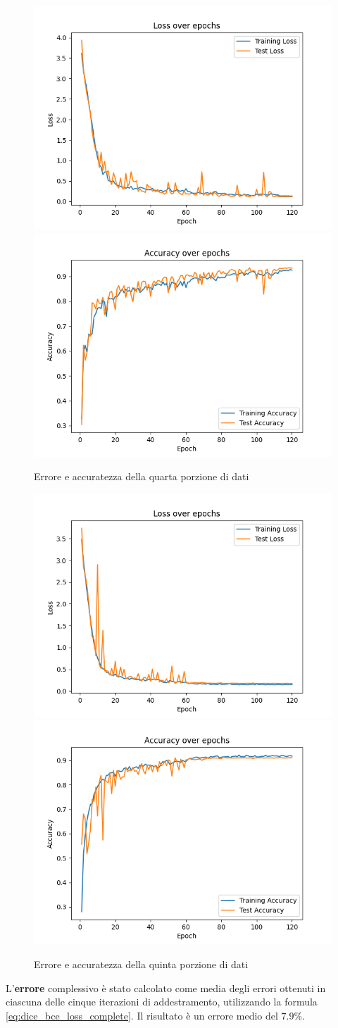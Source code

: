 \begin{figure}
    \centering
    \includegraphics[width=0.4\columnwidth]{Immagini/fold_3_loss.png} \includegraphics[width=0.4\columnwidth]{Immagini/fold_3_accuracy.png}
    \caption{Errore e accuratezza della quarta porzione di dati}
    \label{fig:loss e accuratezza della quarta porzione di dati}
\end{figure}

\begin{figure}
    \centering
    \includegraphics[width=0.4\columnwidth]{Immagini/fold_4_loss.png} \includegraphics[width=0.4\columnwidth]{Immagini/fold_4_accuracy.png}
    \caption{Errore e accuratezza della quinta porzione di dati}
    \label{fig:loss e accuratezza della quinta porzione di dati}
\end{figure}


L'\textbf{errore} complessivo è stato calcolato come media degli errori ottenuti in ciascuna delle
cinque iterazioni di addestramento, utilizzando la formula \ref{eq:dice_bce_loss_complete}. Il
risultato è un errore medio del \textbf{$7.9\%$}.

